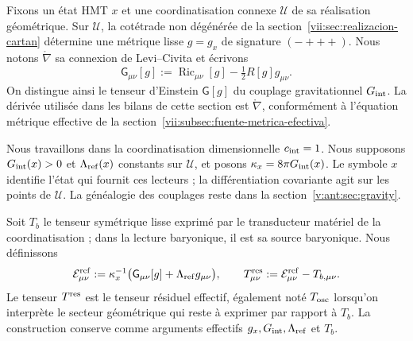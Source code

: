 Fixons un état HMT \(x\) et une coordinatisation connexe \(\mathcal U\) de sa réalisation géométrique. Sur \(\mathcal U\), la cotétrade non dégénérée de la section~\ref{vii:sec:realizacion-cartan} détermine une métrique lisse \(g=g_x\) de signature \((-+++)\). Nous notons \(\mathring\nabla\) sa connexion de Levi--Civita et écrivons
\[
 \mathsf G_{\mu\nu}[g]
 :=\operatorname{Ric}_{\mu\nu}[g]-\tfrac12R[g]g_{\mu\nu}.
\]
On distingue ainsi le tenseur d'Einstein \(\mathsf G[g]\) du couplage
gravitationnel \(G_{\rm int}\). La dérivée utilisée dans les bilans
de cette section est \(\mathring\nabla\), conformément à l'équation
métrique effective de la section~\ref{vii:subsec:fuente-metrica-efectiva}.

Nous travaillons dans la coordinatisation dimensionnelle \(c_{\rm int}=1\). Nous supposons \(G_{\rm int}(x)>0\) et \(\Lambda_{\rm ref}(x)\) constants sur \(\mathcal U\), et posons \(\kappa_x=8\pi G_{\rm int}(x)\). Le symbole \(x\) identifie l'état qui fournit ces lecteurs ; la différentiation covariante agit sur les points de \(\mathcal U\). La généalogie des couplages reste dans la section~\ref{v:ant:sec:gravity}.

Soit \(T_b\) le tenseur symétrique lisse exprimé par le transducteur matériel de la coordinatisation ; dans la lecture baryonique, il est sa source baryonique. Nous définissons
\begin{equation}
 \mathcal E^{\rm ref}_{\mu\nu}
 :=\kappa_x^{-1}\bigl(\mathsf G_{\mu\nu}[g]
                            +\Lambda_{\rm ref}g_{\mu\nu}\bigr),
 \qquad
 T^{\rm res}_{\mu\nu}:=\mathcal E^{\rm ref}_{\mu\nu}-T_{b,\mu\nu}.
 \label{vii:eq:residual-definicion}
\end{equation}
Le tenseur \(T^{\rm res}\) est le tenseur résiduel effectif, également noté \(T_{\rm osc}\) lorsqu'on interprète le secteur géométrique qui reste à exprimer par rapport à \(T_b\). La construction conserve comme arguments effectifs \(g_x,G_{\rm int},\Lambda_{\rm ref}\) et \(T_b\).

